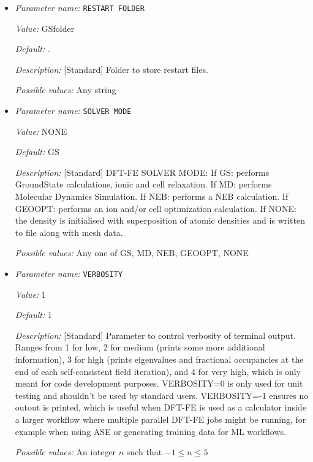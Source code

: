 \begin{itemize}
{\it Default:} false


{\it Description:} [Standard] If set to true RESTART triggers restart checks and modifies the input files for coordinates, domain vectors. Default: false.


{\it Possible values:} A boolean value (true or false)
\item {\it Parameter name:} {\tt RESTART FOLDER}
\label{parameters:RESTART FOLDER}
\label{parameters:RESTART_20FOLDER}


{\it Value:} GSfolder


{\it Default:} .


{\it Description:} [Standard] Folder to store restart files.


{\it Possible values:} Any string
\item {\it Parameter name:} {\tt SOLVER MODE}
\label{parameters:SOLVER MODE}
\label{parameters:SOLVER_20MODE}


{\it Value:} NONE


{\it Default:} GS


{\it Description:} [Standard] DFT-FE SOLVER MODE: If GS: performs GroundState calculations, ionic and cell relaxation. If MD: performs Molecular Dynamics Simulation. If NEB: performs a NEB calculation. If GEOOPT: performs an ion and/or cell optimization calculation. If NONE: the density is initialised with superposition of atomic densities and is written to file along with mesh data.


{\it Possible values:} Any one of GS, MD, NEB, GEOOPT, NONE
\item {\it Parameter name:} {\tt VERBOSITY}
\label{parameters:VERBOSITY}


{\it Value:} 1


{\it Default:} 1


{\it Description:} [Standard] Parameter to control verbosity of terminal output. Ranges from 1 for low, 2 for medium (prints some more additional information), 3 for high (prints eigenvalues and fractional occupancies at the end of each self-consistent field iteration), and 4 for very high, which is only meant for code development purposes. VERBOSITY=0 is only used for unit testing and shouldn't be used by standard users. VERBOSITY=-1 ensures no outout is printed, which is useful when DFT-FE is used as a calculator inside a larger workflow where multiple parallel DFT-FE jobs might be running, for example when using ASE or generating training data for ML workflows.


{\it Possible values:} An integer $n$ such that $-1\leq n \leq 5$
\end{itemize}




